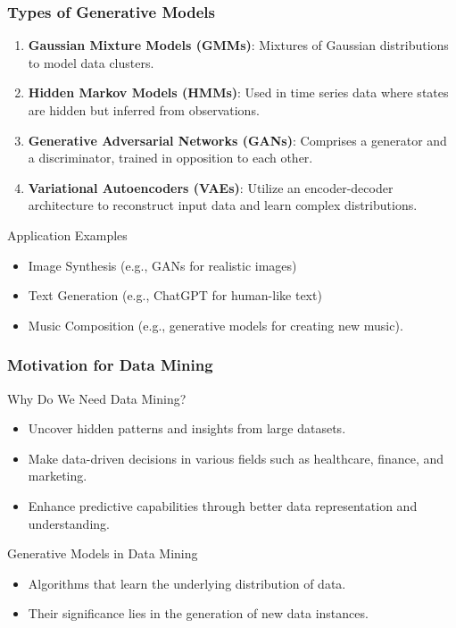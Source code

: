 \documentclass[aspectratio=169]{beamer}
\begin{document}
\begin{frame}[fragile]
    \frametitle{Types of Generative Models}
    \begin{enumerate}
        \item \textbf{Gaussian Mixture Models (GMMs)}: Mixtures of Gaussian distributions to model data clusters.
        
        \item \textbf{Hidden Markov Models (HMMs)}: Used in time series data where states are hidden but inferred from observations.
        
        \item \textbf{Generative Adversarial Networks (GANs)}: Comprises a generator and a discriminator, trained in opposition to each other.
        
        \item \textbf{Variational Autoencoders (VAEs)}: Utilize an encoder-decoder architecture to reconstruct input data and learn complex distributions.
    \end{enumerate}

    \begin{block}{Application Examples}
        \begin{itemize}
            \item Image Synthesis (e.g., GANs for realistic images)
            \item Text Generation (e.g., ChatGPT for human-like text)
            \item Music Composition (e.g., generative models for creating new music).
        \end{itemize}
    \end{block}
\end{frame}

\begin{frame}[fragile]
    \frametitle{Motivation for Data Mining}
    \begin{block}{Why Do We Need Data Mining?}
        \begin{itemize}
            \item Uncover hidden patterns and insights from large datasets.
            \item Make data-driven decisions in various fields such as healthcare, finance, and marketing.
            \item Enhance predictive capabilities through better data representation and understanding.
        \end{itemize}
    \end{block}
    \begin{block}{Generative Models in Data Mining}
        \begin{itemize}
            \item Algorithms that learn the underlying distribution of data.
            \item Their significance lies in the generation of new data instances.
        \end{itemize}
    \end{block}
\end{frame}
\end{document}
